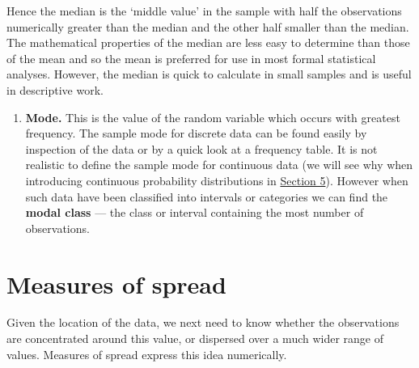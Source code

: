\documentclass[
]{book}
\providecommand{\tightlist}{%
  \setlength{\itemsep}{0pt}\setlength{\parskip}{0pt}}
\begin{document}
Hence the median is the `middle value' in the sample with half the
observations numerically greater than the median and the other half
smaller than the median. The mathematical properties of the median
are less easy to determine than those of the mean and so the mean is
preferred for use in most formal statistical analyses. However, the
median is quick to calculate in small samples and is useful in
descriptive work.

\begin{enumerate}
\def\labelenumi{\arabic{enumi}.}
\setcounter{enumi}{2}
\tightlist
\item
  {\textbf{Mode.}} This is the value of the random variable which occurs
  with greatest frequency. The sample mode for discrete data can be
  found easily by inspection of the data or by a quick look at a
  frequency table. It is not realistic to define the sample mode for
  continuous data (we will see why when introducing continuous probability distributions in \protect\hyperlink{rv}{Section 5}). However when such data have been classified into
  intervals or categories we can find the \textbf{modal class} --- the
  class or interval containing the most number of observations.
\end{enumerate}

\hypertarget{summary_spread}{%
\section{Measures of spread}\label{summary_spread}}

Given the location of the data, we next need to know whether the
observations are concentrated around this value, or dispersed over a
much wider range of values. Measures of spread express this idea
numerically.
\end{document}
